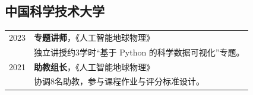 \subsection*{中国科学技术大学}
\begin{longtable}{@{}p{}p{}@{}}
2023 & \textbf{专题讲师}，《人工智能地球物理》 \\
     & 独立讲授约3学时“基于 Python 的科学数据可视化”专题。 \\[0.5em]
2021 & \textbf{助教组长}，《人工智能地球物理》 \\
     & 协调8名助教，参与课程作业与评分标准设计。 \\
\end{longtable}
